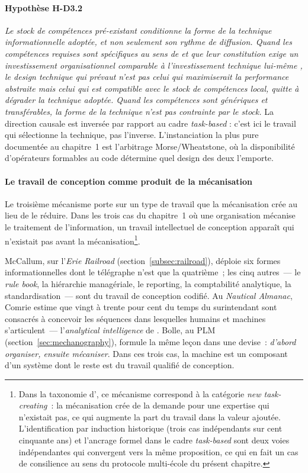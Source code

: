 \paragraph{Hypothèse H-D3.2} \emph{Le stock de compétences pré-existant conditionne la forme de la technique informationnelle adoptée, et non seulement son rythme de diffusion. Quand les compétences requises sont spécifiques au sens de \textcite{williamson_economic_1985} et que leur constitution exige un investissement organisationnel comparable à l'investissement technique lui-même \parencite{bresnahan_information_2002}, le design technique qui prévaut n'est pas celui qui maximiserait la performance abstraite mais celui qui est compatible avec le stock de compétences local, quitte à dégrader la technique adoptée. Quand les compétences sont génériques et transférables, la forme de la technique n'est pas contrainte par le stock.} La direction causale est inversée par rapport au cadre \emph{task-based} : c'est ici le travail qui sélectionne la technique, pas l'inverse. L'instanciation la plus pure documentée au chapitre~1 est l'arbitrage Morse/Wheatstone, où la disponibilité d'opérateurs formables au code détermine quel design des deux l'emporte.

\paragraph{Le travail de conception comme produit de la mécanisation}

Le troisième mécanisme porte sur un type de travail que la mécanisation crée au lieu de le réduire. Dans les trois cas du chapitre~1 où une organisation mécanise le traitement de l'information, un travail intellectuel de conception apparaît qui n'existait pas avant la mécanisation\footnote{Dans la taxonomie d'\textcite{acemoglu_building_2026}, ce mécanisme correspond à la catégorie \emph{new task-creating}~: la mécanisation crée de la demande pour une expertise qui n'existait pas, ce qui augmente la part du travail dans la valeur ajoutée. L'identification par induction historique (trois cas indépendants sur cent cinquante ans) et l'ancrage formel dans le cadre \emph{task-based} sont deux voies indépendantes qui convergent vers la même proposition, ce qui en fait un cas de consilience au sens du protocole multi-école du présent chapitre.}.

McCallum, sur l'\emph{Erie Railroad} (section~\ref{subsec:railroad}), déploie six formes informationnelles dont le télégraphe n'est que la quatrième~; les cinq autres~--- le \emph{rule book}, la hiérarchie managériale, le reporting, la comptabilité analytique, la standardisation~--- sont du travail de conception codifié. Au \emph{Nautical Almanac}, Comrie estime que vingt à trente pour cent du temps du surintendant sont consacrés à concevoir les séquences dans lesquelles humains et machines s'articulent~--- l'\emph{analytical intelligence} de \textcite{daston_calculation_2018}. Bolle, au PLM (section~\ref{sec:mechanography}), formule la même leçon dans une devise~: \og \emph{d'abord organiser, ensuite mécaniser}\fg{}. Dans ces trois cas, la machine est un composant d'un système dont le reste est du travail qualifié de conception.

